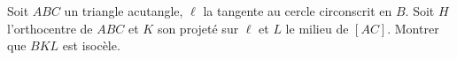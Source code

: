 Soit $ABC$ un triangle acutangle, $\ell$ la tangente au cercle circonscrit en $B$. Soit $H$ l'orthocentre de $ABC$ et $K$ son projeté sur $\ell$ et $L$ le milieu de $[AC]$. Montrer que $BKL$ est isocèle.
